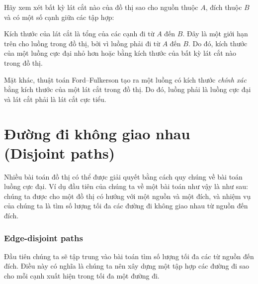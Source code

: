 Hãy xem xét bất kỳ lát cắt nào của đồ thị
sao cho nguồn thuộc $A$,
đích thuộc $B$
và có một số cạnh giữa các tập hợp:

\begin{center}
\end{center}

Kích thước của lát cắt là tổng của các cạnh
đi từ $A$ đến $B$.
Đây là một giới hạn trên cho luồng
trong đồ thị, bởi vì luồng phải đi
từ $A$ đến $B$.
Do đó, kích thước của một luồng cực đại nhỏ hơn hoặc bằng
kích thước của bất kỳ lát cắt nào trong đồ thị.

Mặt khác, thuật toán Ford–Fulkerson
tạo ra một luồng có kích thước \emph{chính xác} bằng
kích thước của một lát cắt trong đồ thị.
Do đó, luồng phải là luồng cực đại
và lát cắt phải là lát cắt cực tiểu.

\section{Đường đi không giao nhau (Disjoint paths)}

Nhiều bài toán đồ thị có thể được giải quyết bằng cách quy
chúng về bài toán luồng cực đại.
Ví dụ đầu tiên của chúng ta về một bài toán như vậy là
như sau: chúng ta được cho một đồ thị có hướng
với một nguồn và một đích,
và nhiệm vụ của chúng ta là tìm số lượng tối đa
các đường đi không giao nhau từ nguồn đến đích.

\subsubsection{Edge-disjoint paths}

Đầu tiên chúng ta sẽ tập trung vào bài toán
tìm số lượng tối đa các
 từ nguồn đến đích.
Điều này có nghĩa là chúng ta nên xây dựng một tập hợp các đường đi
sao cho mỗi cạnh xuất hiện trong tối đa một đường đi.

